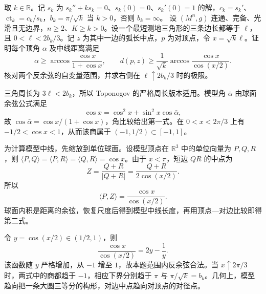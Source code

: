 \begin{optionalexercise}\label{g3:ex:positive-curvature-equilateral-median}
	取 \(k\in\mathbb R\)。记 \(s_k\) 为 \(s_k''+ks_k=0\)、\(s_k(0)=0\)、\(s_k'(0)=1\) 的解，\(c_k=s_k'\)、\(\operatorname{ct}_k=c_k/s_k\)，\(b_k=\pi/\sqrt k\) 当 \(k>0\)，否则 \(b_k=\infty\)。
 设 \((M^n,g)\) 连通、完备、光滑且无边界，\(n\ge2\)、\(K\ge k>0\)。设一个最短测地三角形的三条边长都等于 \(\ell\)，且 \(0<\ell<2b_k/3\)。记 \(z\) 为其中一边的弧长中点，\(p\) 为对顶点，令 \(x=\sqrt{k}\ell\)。证明每个顶角 \(\alpha\) 及中线距离满足
 \[
 \alpha\ge\arccos\frac{\cos x}{1+\cos x},\qquad
 d(p,z)\ge\frac1{\sqrt{k}}\arccos\frac{\cos x}{\cos(x/2)}.
 \]
 核对两个反余弦的自变量范围，并求右侧在 \(\ell\uparrow2b_k/3\) 时的极限。
\end{optionalexercise}
\begin{solution}
 三角周长为 \(3\ell<2b_k\)，所以 Toponogov 的严格周长版本适用。模型角 \(\bar\alpha\) 由球面余弦公式满足
 \[
 \cos x=\cos^2x+\sin^2x\cos\bar\alpha,
 \]
 故 \(\cos\bar\alpha=\cos x/(1+\cos x)\)，角比较给出第一式。在 \(0<x<2\pi/3\) 上有 \(-1/2<\cos x<1\)，从而该商属于 \((-1,1/2)\subset[-1,1]\)。

 为计算模型中线，先缩放到单位球面。设模型顶点在 \(\mathbb R^3\) 中的单位向量为 \(P,Q,R\)，则
 \(\langle P,Q\rangle=\langle P,R\rangle=\langle Q,R\rangle=\cos x\)。由于 \(x<\pi\)，短边 \(QR\) 的中点为
 \[
 Z=\frac{Q+R}{|Q+R|}=\frac{Q+R}{2\cos(x/2)}.
 \]
 所以
 \[
 \langle P,Z\rangle=\frac{\cos x}{\cos(x/2)}.
 \]
 球面内积是距离的余弦，恢复尺度后得到模型中线长度，再用顶点—对边比较即得第二式。

 令 \(y=\cos(x/2)\in(1/2,1)\)，则
 \[
 \frac{\cos x}{\cos(x/2)}=2y-\frac1y.
 \]
 该函数随 \(y\) 严格增加，从 \(-1\) 增至 \(1\)，故本题范围内反余弦合法。当 \(x\uparrow2\pi/3\) 时，两式中的商都趋于 \(-1\)，相应下界分别趋于 \(\pi\) 与 \(\pi/\sqrt{k}=b_k\)。几何上，模型趋向把一条大圆三等分的构形，对边中点趋向对顶点的对径点。
\end{solution}

